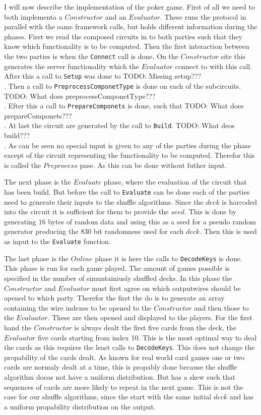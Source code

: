\documentclass[twoside,11pt,openright]{report}
\newcommand{\todo}[1]{}
\renewcommand{\todo}[1]{{\color{red} TODO: {#1}} \\}
\begin{document}
\bigskip

I will now describe the implementation of the poker game. First of all we need to both implementa a $Constructor$ and an $Evaluator$. These runs the protocol in parallel with the same framework calls, but holds different information during the phases. First we read the composed circuits in to both parties such that they know which functionality is to be computed. 
Then the first interaction between the two parties is when the \verb|Connect| call is done. On the $Constructor$ site this generates the server functionality which the $Evaluator$ connect to with this call. 
After this a call to \verb|Setup| was done to \todo{Missing setup???}.
Then a call to \verb|PreprocessComponetType| is done on each of the subcircuits. \todo{What does preprocessComponetType???}.  
Efter this a call to \verb|PrepareComponets| is done, such that \todo{What does prepareComponets???}.
At last the circuit are generated by the call to \verb|Build|. \todo{What deos build???}.
As can be seen no special input is given to any of the parties during the phase except of the circuit representing the functionality to be computed. Therefor this is called the $Preprocess$ pase. As this can be done without futher input.

The next phase is the $Evaluate$ phase, where the evaluation of the circuit that has been build. But before the call to \verb|Evaluate| can be done each of the parties need to generate their inputs to the shuffle algorithms. Since the $deck$ is harcoded into the circuit it is sufficient for them to provide the $seed$. This is done by generating $16$ bytes of random data and using this as a seed for a pseudo random generator producing the 830 bit randomness used for each $deck$. Then this is used as input to the \verb|Evaluate| function. 

The last phase is the $Online$ phase it is here the calls to \verb|DecodeKeys| is done. This phase is run for each game played. The amount of games possible is specified in the number of simuntainiusly shuffled decks. In this phase the $Constructor$ and $Evaluator$ must first agree on which outputwires should be opened to which party. Therefor the first the do is to generate an array containing the wire indexes to be opened to the $Constructor$ and then those to the $Evaluator$. These are then opened and displayed to the players. For the first hand the $Constructor$ is always dealt the first five cards from the deck, the $Evaluator$ five cards starting from index 10. This is the most optimal way to deal the cards as this requires the least calls to \verb|DecodeKeys|. This does not change the propability of the cards dealt. As known for real world card games one or two cards are normaly dealt at a time, this is propably done because the shuffle algorithm doeas not have a uniform distribution. But has a skew such that sequences of cards are more likely to repeat in the next game. This is not the case for our shuffle algorithms, since the start with the same initial $deck$ and has a uniform propability distribution on the output. 
\end{document}

